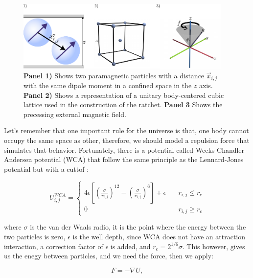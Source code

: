 \begin{figure}[H]
  \begin{center}
    \includegraphics[width=0.95\textwidth]{figures/methods1.pdf}
  \end{center}
  \caption{\textbf{Panel 1)} Shows two paramagnetic particles with a distance \(\vec{x}_{i,j}\) with the same dipole moment in a confined space in the \( z\) axis. \textbf{Panel 2)} Shows a representation of a  unitary body-centered cubic lattice used in the construction of the ratchet. \textbf{Panel 3} Shows the precessing external magnetic field.}\label{fig:facecenteredlattice}
\end{figure}

Let's remember that one important rule for the universe is that, one body cannot occupy the same space as other, therefore, we should model a repulsion force that simulates that behavior. Fortunately, there is a potential called Weeks-Chandler-Andersen potential (WCA) that follow the same principle as the Lennard-Jones potential but with a cuttof \cite{hess1999augmented}:

\begin{equation}
  U_{i,j}^{WCA} = \begin{cases} 
    4\epsilon\left[ \left( \frac{\sigma}{r_{i,j}}\right)^{12} - \left( \frac{\sigma}{r_{i,j}}\right)^6\right] + \epsilon \quad &r_{i,j} \leq r_c \\
    0 \quad & r_{i,j} \geq r_c
  \end{cases}
  \label{eq:wcapotential}
\end{equation}

where $\sigma$ is the van der Waals radio, it is the point where the energy between the two particles is zero, $\epsilon$ is the well depth, since WCA does not have an attraction interaction, a correction factor of $\epsilon$ is added, and $r_c = 2^{1/6}\sigma$. This however, gives us the enegy between particles, and we need the force, then we apply:

\begin{equation}
 F = - \nabla U, 
  \label{eq:negativegradient}
\end{equation}

